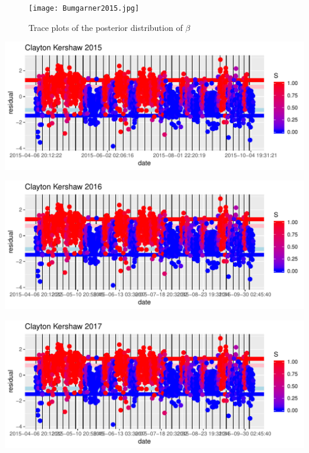 \documentclass[letterpaper,12pt]{article}\usepackage[]{graphicx}\usepackage[]{color}
\makeatletter
\def\maxwidth{ %
  \ifdim\Gin@nat@width>\linewidth
    \linewidth
  \else
    \Gin@nat@width
  \fi
}
\newenvironment{knitrout}{}{} %
\makeatother
\begin{document}
\begin{figure}[ht]
\texttt{[image: Bumgarner2015.jpg]}
	  \caption{Trace plots of the posterior distribution of $\beta$}
  \label{betaPosterior}
\end{figure}

\begin{knitrout}
\color{fgcolor}
\includegraphics[width=\maxwidth]{figure/unnamed-chunk-1-1} 

\end{knitrout}


\begin{knitrout}
\color{fgcolor}
\includegraphics[width=\maxwidth]{figure/unnamed-chunk-2-1} 

\end{knitrout}


\begin{knitrout}
\color{fgcolor}
\includegraphics[width=\maxwidth]{figure/unnamed-chunk-3-1} 

\end{knitrout}
\end{document}
